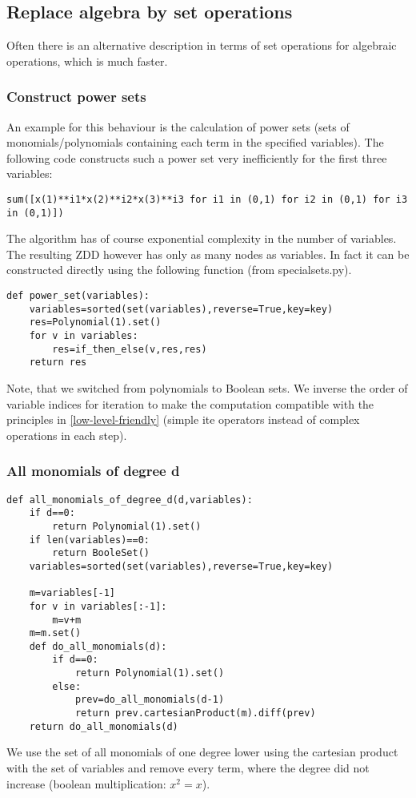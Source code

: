 \documentclass[]{article}
\newcommand{\ite}{{ite}\xspace}
\newcounter{thm}
\begin{document}
\subsection{Replace algebra by set operations}
Often there is an alternative description in terms of set operations for algebraic operations, which is much faster.

\subsubsection{Construct power sets}
An example for this behaviour is the calculation of power sets (sets of monomials/polynomials containing each term in the specified variables).
The following code constructs such a power set very inefficiently for the first three variables:
\begin{verbatim}
sum([x(1)**i1*x(2)**i2*x(3)**i3 for i1 in (0,1) for i2 in (0,1) for i3 in (0,1)])
\end{verbatim}
The algorithm has of course exponential complexity in the number of variables.
The resulting ZDD however has only as many nodes as variables.
In fact it can be constructed directly using the following function (from specialsets.py).
\begin{verbatim}
def power_set(variables):
    variables=sorted(set(variables),reverse=True,key=key)
    res=Polynomial(1).set()
    for v in variables:
        res=if_then_else(v,res,res)
    return res 
\end{verbatim}
Note, that we switched from polynomials to Boolean sets. We inverse the order of variable indices for iteration to make the computation compatible with the principles in \ref{low-level-friendly} (simple \ite operators instead of complex operations in each step).

\subsubsection{All monomials of degree d}
\begin{verbatim}
def all_monomials_of_degree_d(d,variables):
    if d==0:
        return Polynomial(1).set()
    if len(variables)==0:
        return BooleSet()
    variables=sorted(set(variables),reverse=True,key=key)

    m=variables[-1]
    for v in variables[:-1]:
        m=v+m
    m=m.set()
    def do_all_monomials(d):
        if d==0:
            return Polynomial(1).set()
        else:
            prev=do_all_monomials(d-1)
            return prev.cartesianProduct(m).diff(prev)
    return do_all_monomials(d)
\end{verbatim}
We use the set of all monomials of one degree lower using the cartesian product with the set of variables and remove every term, where the degree did not increase (boolean multiplication: $x^2=x$).
\end{document}
